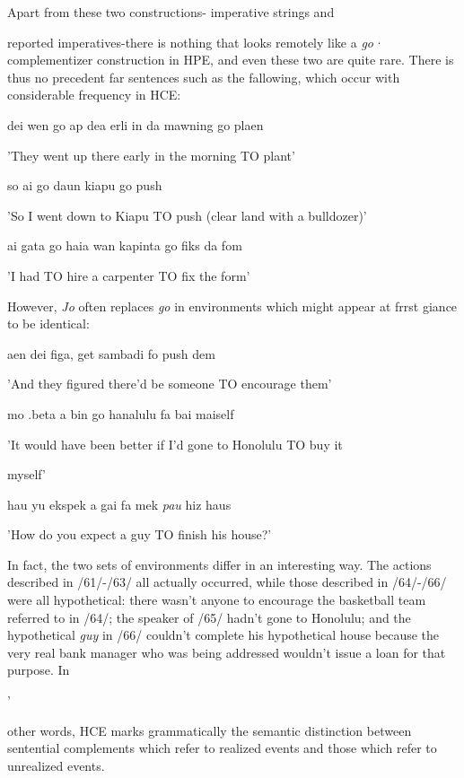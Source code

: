 Apart from these two constructions- imperative strings and

reported imperatives-there is nothing that looks remotely like a \textit{go·} complementizer construction in HPE, and even these two are quite rare. There is thus no precedent far sentences such as the fallowing, which occur with considerable frequency in HCE:

\ea\label{ex:61}
 dei wen go ap dea erli in da mawning go plaen
\glt
\z

'They went up there early in the morning TO plant'

\ea\label{ex:62}
 so ai go daun kiapu go push
\glt
\z

'So I went down to Kiapu TO push (clear land with a bulldozer)'

\ea\label{ex:63}
 ai gata go haia wan kapinta go fiks da fom
\glt
\z

'I had TO hire a carpenter TO fix the form'

However, \textit{Jo }often replaces \textit{go} in environments which might appear at frrst giance to be identical:

\ea\label{ex:64}
 aen dei figa, get sambadi fo push dem
\glt
\z

'And they figured there'd be someone TO encourage them'

\ea\label{ex:65}
 mo .beta a bin go hanalulu fa bai maiself
\glt
\z

'It would have been better if I'd gone to Honolulu TO buy it

myself'

\ea\label{ex:66}
 hau yu ekspek a gai fa mek \textit{pau }hiz haus
\glt
\z

'How do you expect a guy TO finish his house?'

In fact, the two sets of environments differ in an interesting way. The actions described in /61/-/63/ all actually occurred, while those de\-scribed in /64/-/66/ were all hypothetical: there wasn't anyone to encourage the basketball team referred to in /64/; the speaker of /65/ hadn't gone to Honolulu; and the hypothetical \textit{guy} in /66/ couldn't complete his hypothetical house because the very real bank manager who was being addressed wouldn't issue a loan for that purpose. In

'


other words, HCE marks grammatically the semantic distinction be\-tween sentential complements which refer to realized events and those which refer to unrealized events.

